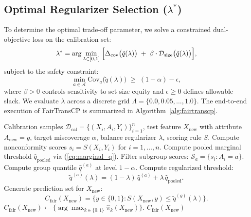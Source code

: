 \documentclass[conference]{IEEEtran}
\begin{document}
\subsection{Optimal Regularizer Selection ($\lambda^*$)}
To determine the optimal trade-off parameter, we solve a constrained dual-objective loss on the calibration set:
\begin{equation}
\lambda^* = \arg\min_{\lambda \in [0, 1]} \;\Bigl[\Delta_{\text{cov}}\bigl(\tilde{q}(\lambda)\bigr) \;+\; \beta \cdot \mathcal{D}_{\text{size}}\bigl(\tilde{q}(\lambda)\bigr)\Bigr],
\end{equation}
subject to the safety constraint:
\begin{equation}
\min_{a \in \mathcal{A}} \text{Cov}_a\bigl(\tilde{q}(\lambda)\bigr) \;\ge\; (1 - \alpha) - \epsilon,
\end{equation}
where $\beta > 0$ controls sensitivity to set-size equity and $\epsilon \ge 0$ defines allowable slack. We evaluate $\lambda$ across a discrete grid $\Lambda = \{0.0, 0.05, \dots, 1.0\}$. The end-to-end execution of FairTransCP is summarized in Algorithm~\ref{alg:fairtranscp}.

\begin{algorithm}[t]
\caption{FairTransCP Calibration and Set Prediction}
\label{alg:fairtranscp}
\begin{algorithmic}[1]
\REQUIRE Calibration samples $\mathcal{D}_{\text{cal}} = \{(X_i, A_i, Y_i)\}_{i=1}^n$, test feature $X_{\text{new}}$ with attribute $A_{\text{new}} = g$, target miscoverage $\alpha$, balance regularizer $\lambda$, scoring rule $S$.
\STATE Compute nonconformity scores $s_i = S(X_i, Y_i)$ for $i = 1, \dots, n$.
\STATE Compute pooled marginal threshold $\hat{q}_{\text{pooled}}$ via (\ref{eq:marginal_q}).
    \STATE Filter subgroup scores: $\mathcal{S}_a = \{s_i : A_i = a\}$.
    \STATE Compute group quantile $\hat{q}^{(a)}$ at level $1 - \alpha$.
    \STATE Compute regularized threshold:
    \begin{equation*}
    \tilde{q}^{(a)}(\lambda) = (1 - \lambda)\,\hat{q}^{(a)} + \lambda\,\hat{q}_{\text{pooled}}.
    \end{equation*}
\ENDFOR
\STATE Generate prediction set for $X_{\text{new}}$:
\begin{equation*}
C_{\text{fair}}(X_{\text{new}}) = \bigl\{y \in \{0, 1\} : S(X_{\text{new}}, y) \le \tilde{q}^{(g)}(\lambda)\bigr\}.
\end{equation*}
    \STATE $C_{\text{fair}}(X_{\text{new}}) \leftarrow \{\arg\max_{k \in \{0, 1\}} \hat{\pi}_k(X_{\text{new}})\}$.
\ENDIF
\RETURN $C_{\text{fair}}(X_{\text{new}})$
\end{algorithmic}
\end{algorithm}
\end{document}
